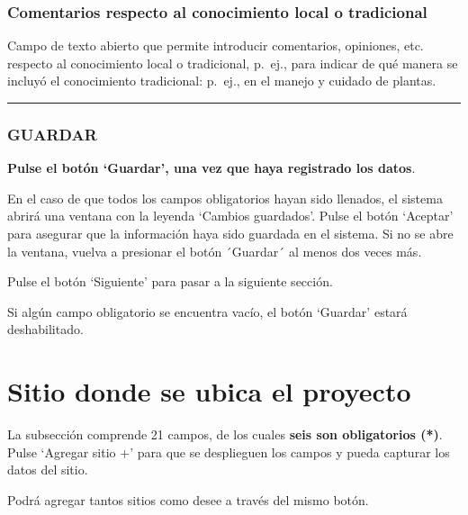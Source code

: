 \documentclass[
]{book}
\begin{document}
\hypertarget{comentarios-respecto-al-conocimiento-local-o-tradicional}{%
\subsection*{Comentarios respecto al conocimiento local o tradicional}\label{comentarios-respecto-al-conocimiento-local-o-tradicional}}

Campo de texto abierto que permite introducir comentarios, opiniones, etc. respecto al conocimiento local o tradicional, p.~ej., para indicar de qué manera se incluyó el conocimiento tradicional: p.~ej., en el manejo y cuidado de plantas.

\begin{center}\rule{0.5\linewidth}{0.5pt}\end{center}

\hypertarget{guardar-3}{%
\subsection*{GUARDAR}\label{guardar-3}}

\textbf{Pulse el botón `Guardar', una vez que haya registrado los datos}.

En el caso de que todos los campos obligatorios hayan sido llenados, el sistema abrirá una ventana con la leyenda `Cambios guardados'. Pulse el botón `Aceptar' para asegurar que la información haya sido guardada en el sistema. Si no se abre la ventana, vuelva a presionar el botón ´Guardar´ al menos dos veces más.

Pulse el botón `Siguiente' para pasar a la siguiente sección.

Si algún campo obligatorio se encuentra vacío, el botón `Guardar' estará deshabilitado.

\hypertarget{sitio-donde-se-ubica-el-proyecto}{%
\chapter*{Sitio donde se ubica el proyecto}\label{sitio-donde-se-ubica-el-proyecto}}

La subsección comprende 21 campos, de los cuales \textbf{seis son obligatorios ({*})}.
Pulse `Agregar sitio +' para que se desplieguen los campos y pueda capturar los datos del sitio.

Podrá agregar tantos sitios como desee a través del mismo botón.
\end{document}
